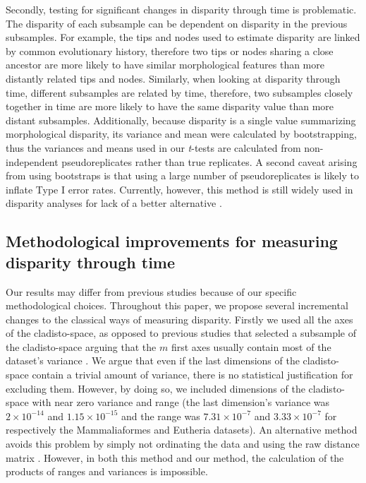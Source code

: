 Secondly, testing for significant changes in disparity through time is problematic.
The disparity of each subsample can be dependent on disparity in the previous subsamples.
For example, the tips and nodes used to estimate disparity are linked by common evolutionary history, therefore two tips or nodes sharing a close ancestor are more likely to have similar morphological features than more distantly related tips and nodes.
Similarly, when looking at disparity through time, different subsamples are related by time, therefore, two subsamples closely together in time are more likely to have the same disparity value than more distant subsamples.
Additionally, because disparity is a single value summarizing morphological disparity, its variance and mean were calculated by bootstrapping, thus the variances and means used in our \textit{t}-tests are calculated from non-independent pseudoreplicates rather than true replicates.
A second caveat arising from using bootstraps is that using a large number of pseudoreplicates is likely to inflate Type I error rates. 
Currently, however, this method is still widely used in disparity analyses for lack of a better alternative \citep[e.g.][]{anderson2012using,zelditch2012geometric,smith2014joined}.

\subsection{Methodological improvements for measuring disparity through time}
Our results may differ from previous studies because of our specific methodological choices.
Throughout this paper, we propose several incremental changes to the classical ways of measuring disparity.
Firstly we used all the axes of the cladisto-space, as opposed to previous studies that selected a subsample of the cladisto-space arguing that the $m$ first axes usually contain most of the dataset's variance \citep[e.g][]{brusatte50,cisneros2010,prentice2011,anderson2012using,Hughes20082013,bentonmodels2014}.
We argue that even if the last dimensions of the cladisto-space contain a trivial amount of variance, there is no statistical justification for excluding them.
However, by doing so, we included dimensions of the cladisto-space with near zero variance and range (the last dimension's variance was $2\times10^{-14}$ and $1.15\times10^{-15}$ and the range was $7.31\times10^{-7}$ and $3.33\times10^{-7}$ for respectively the Mammaliaformes and Eutheria datasets).
An alternative method avoids this problem by simply not ordinating the data and using the raw distance matrix \citep[e.g.][]{bensonfaunal2014,Close2015}. 
However, in both this method and our method, the calculation of the products of ranges and variances is impossible.

